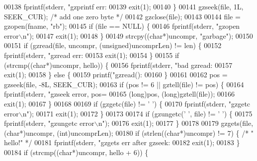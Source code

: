 \begin{DoxyCode}
{{{{00138         fprintf(stderr, \textcolor{stringliteral}{"gzprintf err: %
00139         exit(1);
00140     \}
00141     gzseek(file, 1L, SEEK\_CUR); \textcolor{comment}{/* add one zero byte */}
00142     gzclose(file);
00143 
00144     file = gzopen(fname, \textcolor{stringliteral}{"rb"});
00145     \textcolor{keywordflow}{if} (file == NULL) \{
00146         fprintf(stderr, \textcolor{stringliteral}{"gzopen error\(\backslash\)n"});
00147         exit(1);
00148     \}
00149     strcpy((\textcolor{keywordtype}{char}*)uncompr, \textcolor{stringliteral}{"garbage"});
00150 
00151     \textcolor{keywordflow}{if} (gzread(file, uncompr, (\textcolor{keywordtype}{unsigned})uncomprLen) != len) \{
00152         fprintf(stderr, \textcolor{stringliteral}{"gzread err: %
00153         exit(1);
00154     \}
00155     \textcolor{keywordflow}{if} (strcmp((\textcolor{keywordtype}{char}*)uncompr, hello)) \{
00156         fprintf(stderr, \textcolor{stringliteral}{"bad gzread: %
00157         exit(1);
00158     \} \textcolor{keywordflow}{else} \{
00159         printf(\textcolor{stringliteral}{"gzread(): %
00160     \}
00161 
00162     pos = gzseek(file, -8L, SEEK\_CUR);
00163     \textcolor{keywordflow}{if} (pos != 6 || gztell(file) != pos) \{
00164         fprintf(stderr, \textcolor{stringliteral}{"gzseek error, pos=%
00165                 (\textcolor{keywordtype}{long})pos, (\textcolor{keywordtype}{long})gztell(file));
00166         exit(1);
00167     \}
00168 
00169     \textcolor{keywordflow}{if} (gzgetc(file) != \textcolor{charliteral}{' '}) \{
00170         fprintf(stderr, \textcolor{stringliteral}{"gzgetc error\(\backslash\)n"});
00171         exit(1);
00172     \}
00173 
00174     \textcolor{keywordflow}{if} (gzungetc(\textcolor{charliteral}{' '}, file) != \textcolor{charliteral}{' '}) \{
00175         fprintf(stderr, \textcolor{stringliteral}{"gzungetc error\(\backslash\)n"});
00176         exit(1);
00177     \}
00178 
00179     gzgets(file, (\textcolor{keywordtype}{char}*)uncompr, (\textcolor{keywordtype}{int})uncomprLen);
00180     \textcolor{keywordflow}{if} (strlen((\textcolor{keywordtype}{char}*)uncompr) != 7) \{ \textcolor{comment}{/* " hello!" */}
00181         fprintf(stderr, \textcolor{stringliteral}{"gzgets err after gzseek: %
00182         exit(1);
00183     \}
00184     \textcolor{keywordflow}{if} (strcmp((\textcolor{keywordtype}{char}*)uncompr, hello + 6)) \{
}}}}}}}}}}
\end{DoxyCode}
